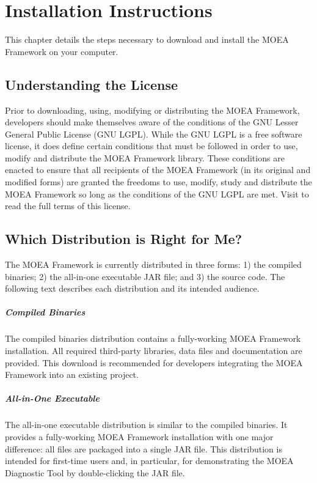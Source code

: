 \chapter{Installation Instructions}

This chapter details the steps necessary to download and install the MOEA Framework on your computer.

\section{Understanding the License}

Prior to downloading, using, modifying or distributing the MOEA Framework, developers should make themselves aware of the conditions of the GNU Lesser General Public License (GNU LGPL).  While the GNU LGPL is a free software license, it does define certain conditions that must be followed in order to use, modify and distribute the MOEA Framework library.  These conditions are enacted to ensure that all recipients of the MOEA Framework (in its original and modified forms) are granted the freedoms to use, modify, study and distribute the MOEA Framework so long as the conditions of the GNU LGPL are met.  Visit  to read the full terms of this license.

\section{Which Distribution is Right for Me?}

The MOEA Framework is currently distributed in three forms: 1) the compiled binaries; 2) the all-in-one executable JAR file; and 3) the source code.  The following text describes each distribution and its intended audience.

\paragraph{Compiled Binaries}
The compiled binaries distribution contains a fully-working MOEA Framework installation.  All required third-party libraries, data files and documentation are provided.  This download is recommended for developers integrating the MOEA Framework into an existing project.

\paragraph{All-in-One Executable}
The all-in-one executable distribution is similar to the compiled binaries.  It provides a fully-working MOEA Framework installation with one major difference: all files are packaged into a single JAR file.  This distribution is intended for first-time users and, in particular, for demonstrating the MOEA Diagnostic Tool by double-clicking the JAR file.

